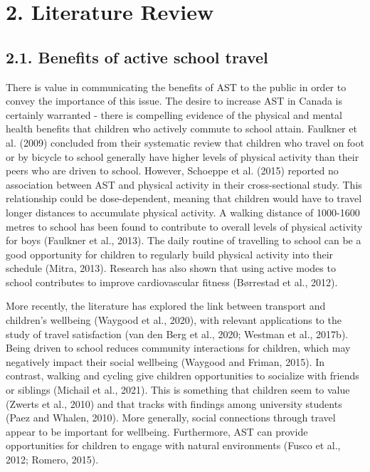 \documentclass[]{elsarticle} %
\begin{document}
\hypertarget{literature-review}{%
\section{2. Literature Review}\label{literature-review}}

\hypertarget{benefits-of-active-school-travel}{%
\subsection{2.1. Benefits of active school
travel}\label{benefits-of-active-school-travel}}

There is value in communicating the benefits of AST to the public in
order to convey the importance of this issue. The desire to increase AST
in Canada is certainly warranted - there is compelling evidence of the
physical and mental health benefits that children who actively commute
to school attain. Faulkner et al. (2009) concluded from their systematic
review that children who travel on foot or by bicycle to school
generally have higher levels of physical activity than their peers who
are driven to school. However, Schoeppe et al. (2015) reported no
association between AST and physical activity in their cross-sectional
study. This relationship could be dose-dependent, meaning that children
would have to travel longer distances to accumulate physical activity. A
walking distance of 1000-1600 metres to school has been found to
contribute to overall levels of physical activity for boys (Faulkner et
al., 2013). The daily routine of travelling to school can be a good
opportunity for children to regularly build physical activity into their
schedule (Mitra, 2013). Research has also shown that using active modes
to school contributes to improve cardiovascular fitness (Børrestad et
al., 2012).

More recently, the literature has explored the link between transport
and children's wellbeing (Waygood et al., 2020), with relevant
applications to the study of travel satisfaction (van den Berg et al.,
2020; Westman et al., 2017b). Being driven to school reduces community
interactions for children, which may negatively impact their social
wellbeing (Waygood and Friman, 2015). In contrast, walking and cycling
give children opportunities to socialize with friends or siblings
(Michail et al., 2021). This is something that children seem to value
(Zwerts et al., 2010) and that tracks with findings among university
students (Paez and Whalen, 2010). More generally, social connections
through travel appear to be important for wellbeing. Furthermore, AST
can provide opportunities for children to engage with natural
environments (Fusco et al., 2012; Romero, 2015).
\end{document}

